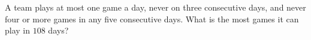 A team plays at most one game a day, never on three consecutive days, and never four or more games in any five consecutive days. What is the most games it can play in $108$ days?
